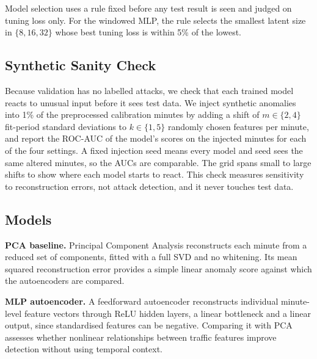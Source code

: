 \documentclass[conference]{IEEEtran}
\begin{document}
Model selection uses a rule fixed before any test result is seen and judged on tuning loss only. For the windowed MLP, the rule selects the smallest latent size in $\{8, 16, 32\}$ whose best tuning loss is within 5\% of the lowest.

\subsection{Synthetic Sanity Check}
Because validation has no labelled attacks, we check that each trained model reacts to unusual input before it sees test data. We inject synthetic anomalies into 1\% of the preprocessed calibration minutes by adding a shift of $m \in \{2, 4\}$ fit-period standard deviations to $k \in \{1, 5\}$ randomly chosen features per minute, and report the ROC-AUC of the model's scores on the injected minutes for each of the four settings. A fixed injection seed means every model and seed sees the same altered minutes, so the AUCs are comparable. The grid spans small to large shifts to show where each model starts to react. This check measures sensitivity to reconstruction errors, not attack detection, and it never touches test data.

\subsection{Models}
\textbf{PCA baseline.} Principal Component Analysis reconstructs each minute from a reduced set of components, fitted with a full SVD and no whitening. Its mean squared reconstruction error provides a simple linear anomaly score against which the autoencoders are compared.

\textbf{MLP autoencoder.} A feedforward autoencoder reconstructs individual minute-level feature vectors through ReLU hidden layers, a linear bottleneck and a linear output, since standardised features can be negative. Comparing it with PCA assesses whether nonlinear relationships between traffic features improve detection without using temporal context.
\end{document}
